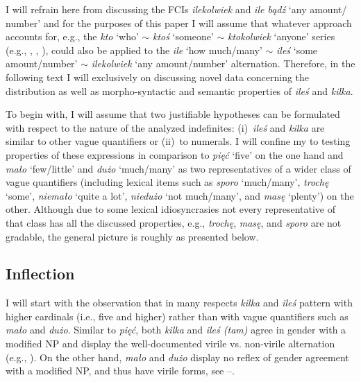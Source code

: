 \documentclass[output=paper, newtxmath, colorlinks, citecolor=brown]{langsci/langscibook}
\begin{document}
	I will refrain here from discussing the FCIs \textit{ilekolwiek} and \textit{ile bądź} `any amount/ number' and for the purposes of this paper I will assume that whatever approach accounts for, e.g., the \textit{kto} `who' $\sim$ \textit{ktoś} `someone' $\sim$ \textit{ktokolwiek} `anyone' series (e.g., \citealt{kadmon_landman1993any}, \citealt{aloni2007free}, \citealt{chierchia2013logic}), could also be applied to the \textit{ile} `how much/many' $\sim$ \textit{ileś} `some amount/number' $\sim$ \textit{ilekolwiek} `any amount/number' alternation. Therefore, in the following text I will  exclusively on discussing novel data concerning the distribution as well as morpho-syntactic and semantic properties of \textit{ileś} and \textit{kilka}.

	To begin with, I will assume that two justifiable hypotheses can be formulated with respect to the nature of the analyzed indefinites: (i)~\textit{ileś} and \textit{kilka} are similar to other vague quantifiers or (ii)~to  numerals. I will confine my  to testing properties of these expressions in comparison to \textit{pięć} `five' on the one hand and \textit{mało} `few/little' and \textit{dużo} `much/many' as two representatives of a wider class of vague quantifiers (including lexical items such as \textit{sporo} `much/many', \textit{trochę} `some', \textit{niemało} `quite a lot', \textit{niedużo} `not much/many', and \textit{masę} `plenty') on the other. Although due to some lexical idiosyncrasies not every representative of that class has all the discussed properties, e.g., \textit{trochę}, \textit{masę}, and \textit{sporo} are not gradable, the general picture is roughly as presented below.

	\subsection{Inflection}\label{sec:inflection}

	I will start with the observation that in many respects  \textit{kilka} and \textit{ileś} pattern with higher cardinals (i.e., five and higher) rather than with vague quantifiers such as \textit{mało} and \textit{dużo}. Similar to \textit{pięć}, both \textit{kilka} and \textit{ileś (tam)} agree in gender with a modified NP and display the well-documented virile vs. non-virile alternation (e.g., \citealt{miechowicz-mathiasen2011syntax}). On the other hand, \textit{mało} and \textit{dużo} display no reflex of gender agreement with a modified NP, and thus have virile forms, see --.
\end{document}
